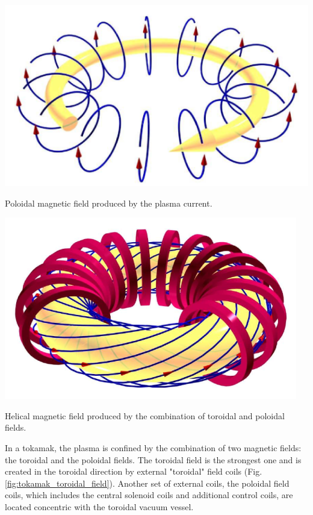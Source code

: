 \begin{marginfigure}[0cm]
	\includegraphics[width=1\linewidth]{figures/chap1/tokamak_poloidal_field}
	\caption{Poloidal magnetic field produced by the plasma current.}
	\label{fig:tokamak_poloidal_field}
\end{marginfigure}

\begin{marginfigure}[0cm]
	\includegraphics[width=1\linewidth]{figures/chap1/tokamak_helical_field}
	\caption{Helical magnetic field produced by the combination of toroidal and poloidal fields.}
	\label{fig:tokamak_helical_field}
\end{marginfigure}

In a tokamak, the plasma is confined by the combination of two magnetic fields: the toroidal and the poloidal fields. The toroidal field is the strongest one and is created in the toroidal direction by external "toroidal" field coils (Fig.\ref{fig:tokamak_toroidal_field}). Another set  of  external  coils, the poloidal field coils, which includes the central solenoid coils and additional control coils, are located concentric with the toroidal vacuum vessel.


